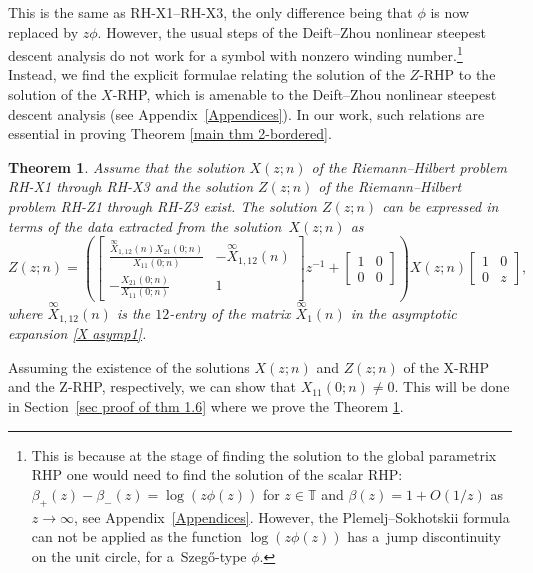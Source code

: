 \documentclass[10pt,a4paper]{amsart}
\numberwithin{equation}{section}
\newtheorem{Theorem}{Theorem}[section]
\newcommand{\T}{{\mathbb T}}
\newcommand{\be}{\beta}
\begin{document}
This is the same as RH-X1--RH-X3, the only difference being that $\phi$ is now replaced by $z\phi$. However, the usual steps of the Deift--Zhou nonlinear steepest descent analysis \cite{DZ} do not work for a symbol with nonzero winding number.\footnote{ This is because at the stage of finding the solution to the global parametrix RHP one would need to find the solution of the scalar RHP: $\be_+(z)-\be_-(z) = \log (z \phi(z))$ for $z \in \T$ and $\be(z)=1+O(1/z)$ as $z \to \infty$, see Appendix~\ref{Appendices}. However, the Plemelj--Sokhotskii formula can not be applied \cite{Gakhov} as the function $\log (z \phi(z))$ has a~jump discontinuity on the unit circle, for a~Szeg\H{o}-type $\phi$.} Instead, we find the explicit formulae relating the solution of the $Z$-RHP to the solution of the $X$-RHP, which is amenable to the Deift--Zhou nonlinear steepest descent analysis (see Appendix~\ref{Appendices}). In our work, such relations are essential in proving Theorem \ref{main thm 2-bordered}. 	
	
	\begin{Theorem}\label{thm Z-RHP intro}
Assume that the solution $X(z;n)$ of the Riemann--Hilbert problem {\rm RH-X1} through {\rm RH-X3} and the solution $Z(z;n)$ of the Riemann--Hilbert problem {\rm RH-Z1} through {\rm RH-Z3} exist. The solution $Z(z;n)$ can be expressed in terms of the data extracted from the solution~${X(z;n)}$ as
		\begin{equation}\label{ZX1}
			Z(z;n) = \left( \begin{bmatrix}
				 \tfrac{\overset{\infty}{X}_{1,12}(n)X_{21}(0;n)}{X_{11}(0;n)} & -\overset{\infty}{X}_{1,12}(n) \\[6pt]
					-\tfrac{X_{21}(0;n)}{X_{11}(0;n)} & 1
			\end{bmatrix} z^{-1} + \begin{bmatrix}
				1 & 0 \\
				0 & 0
			\end{bmatrix} \right) X(z;n) \begin{bmatrix}
				1 & 0 \\
				0 & z
			\end{bmatrix},
		\end{equation}
		where $\overset{\infty}{X}_{1,12}(n)$ is the $12$-entry of the matrix $\overset{\infty}{X}_{1}(n)$ in the asymptotic expansion \eqref{X asymp1}.
	\end{Theorem}
	
	\begin{Remark}
		Assuming the existence of the solutions $X(z;n)$ and $Z(z;n)$ of the X-RHP and the Z-RHP, respectively, we can show that $X_{11}(0;n) \neq 0$. This will be done in
		Section~\ref{sec proof of thm 1.6} where we prove the Theorem \ref{thm Z-RHP intro}.
	\end{Remark}
	
\end{document}
